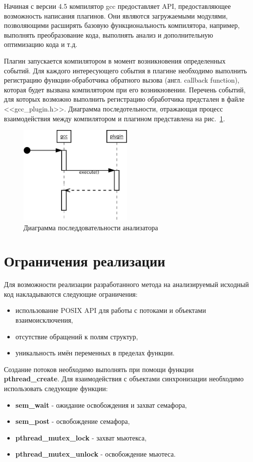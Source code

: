 Начиная с версии 4.5 компилятор gcc предоставляет API, предоставляющее возможность написания плагинов. Они являются загружаемыми модулями, позволяющими расширять базовую функциональность компилятора, например, выполнять преобразование кода, выполнять анализ и дополнительную оптимизацию кода и т.д.

Плагин запускается компилятором в момент возникновения определенных событий. Для каждого интересующего события в плагине необходимо выполнить регистрацию функции-обработчика обратного вызова (англ. callback function), которая будет вызвана компилятором при его возникновении. Перечень событий, для которых возможно выполнить регистрацию обработчика предстален в файле <<gcc\_plugin.h>>. Диаграмма последотельности, отражающая процесс взаимодействия между компилятором и плагином представлена на рис.~\ref{fig:sequence}.

\begin{figure}
  \centering
  \includegraphics[width=0.5\textwidth]{inc/dia/sequence}
  \caption{Диаграмма последдовательности анализатора}
  \label{fig:sequence}
\end{figure}

\section{Ограничения реализации}

Для возможности реализации разработанного метода на анализируемый исходный код накладываются следующие ограничения:
\begin{itemize}
  \item использование POSIX API для работы с потоками и объектами взаимоисключения,
  \item отсутствие обращений к полям структур,
  \item уникальность имён переменных в пределах функции.
\end{itemize}

Создание потоков необходимо выполнять при помощи функции \textbf{pthread\_create}. Для взаимодействия с объектами синхронизации необходимо использовать следующие функции:
\begin{itemize}
  \item \textbf{sem\_wait} - ожидание освобождения и захват семафора,
  \item \textbf{sem\_post} - освобождение семафора,
  \item \textbf{pthread\_mutex\_lock} - захват мьютекса,
  \item \textbf{pthread\_mutex\_unlock} - освобождение мьютеса.
\end{itemize}


